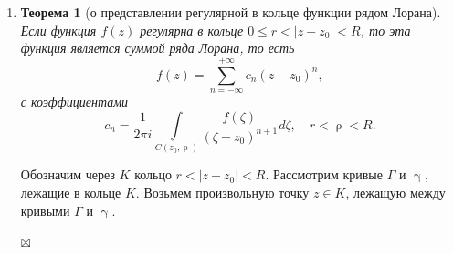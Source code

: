 \documentclass[a4paper, 12pt]{article}
\newenvironment{Proof} %
{\par\noindent{$\blacklozenge$}} %
{\hfill$\scriptstyle\boxtimes$}
\renewcommand{\leq}{\leqslant}
\renewcommand{\gamma}{\upgamma}
\renewcommand{\rho}{\uprho}
\newcommand{\sumz}{\sum\limits_{n = 0}^\infty }
\newtheorem*{theorem}{Теорема}
\begin{document}
\begin{enumerate}
\begin{Proof}
	Разложим в степенной ряд функцию $\dfrac{1}{\zeta - z}$ по степеням $z - z_0$:
	$$\dfrac{1}{\zeta - z} = \dfrac{1}{\zeta - z_0 + z_0 - z} = \dfrac{1}{(\zeta - z_0)(1 - \frac{z-z_0}{\zeta - z_0})} = \dfrac{1}{\zeta - z_0}\sumz\dfrac{(z-z_0)^n}{(\zeta - z_0)^n},$$
	Причем $\dfrac{|z-z_0|}{|\zeta - z_0|} < 1$. И пусть $\zeta \in C(z_0,\rho)$. Следовательно, ряд $\sumz\dfrac{(z-z_0)^n}{(\zeta - z_0)^n}$ сходится равномерно на окружности $C(z_0,\rho)$ по признаку Вейрштрасса.\\\\ Таким образом, ряд $$\dfrac{f(\zeta)}{\zeta - z} = \sumz \dfrac{f(\zeta)}{(\zeta - z_0)^{n+1}}(z-z_0)^n$$ также сходится равномерно на окружности $C(z_0,\rho)$.\\\\
	Проинтегрируем последнее равенство по окружности $C(z_0,\rho)$ и домножим обе части уравнения на $\dfrac{1}{2\pi i}$. Тогда $$\dfrac{1}{2\pi i}\int\limits_{C(z_0,\rho)} \dfrac{f(\zeta)}{\zeta - z}d\zeta = \sumz \dfrac{1}{2\pi i} \Big(\int\limits_{C(z_0,\rho)}\dfrac{f(\zeta)}{(\zeta - z_0)^{n+1}}d\zeta \Big)(z-z_0)^n = \sumz c_n(z-z_0)^n,$$
	где $$c_n = \dfrac{1}{2\pi i}\int\limits_{C(z_0,\rho)}\dfrac{f(\zeta)}{(\zeta - z_0)^{n+1}}d\zeta.$$
	Таким образом, $$f(z) =\sumz c_n(z-z_0)^n,\quad c_n = \dfrac{1}{2\pi i}\int\limits_{C(z_0,\rho)}\dfrac{f(\zeta)}{(\zeta - z_0)^{n+1}}d\zeta,\quad\forall z \in B(z_0, \rho).$$
\end{Proof}
\item \begin{theorem}
	[о представлении регулярной в кольце функции рядом Лорана]
	Если функция $f(z)$ регулярна в кольце $0\leq r < |z-z_0|<R$, то эта функция является суммой ряда Лорана, то есть $$f(z) = \sum\limits_{n=-\infty}^{+\infty}c_n(z-z_0)^n,$$ с коэффициентами $$c_n = \dfrac{1}{2\pi i}\int\limits_{C(z_0,\rho)}\dfrac{f(\zeta)}{(\zeta - z_0)^{n+1}}d\zeta,\quad r < \rho < R.$$
\end{theorem}\begin{Proof}
	Обозначим через $K$ кольцо $r < |z-z_0| < R$. Рассмотрим кривые $\Gamma$ и $\gamma$, лежащие в кольце $K$. Возьмем произвольную точку $z\in K$, лежащую между кривыми $\Gamma$ и $\gamma$.

\end{Proof}
\end{enumerate}
\end{document}
